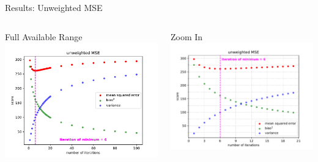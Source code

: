 \documentclass[aspectratio=169]{beamer}
\begin{document}
\begin{frame}{Results: Unweighted MSE}
  \begin{columns}
    \begin{column}{.5\textwidth}
      \centering
      Full Available Range
      \includegraphics[width=\textwidth]{figures/mse_vs_iter.pdf}
    \end{column}
    \begin{column}{.5\textwidth}
      \centering
      Zoom In
      \includegraphics[width=\textwidth]{figures/mse_vs_iter_iterlim20_grid.pdf}
    \end{column}
  \end{columns}
\end{frame}
\end{document}
